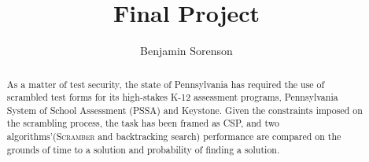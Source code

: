 \documentclass[11pt]{article}
\begin{document}
\author{Benjamin Sorenson} \title{Final Project}
\maketitle

\begin{abstract}

  As a matter of test security, the state of Pennsylvania has required
  the use of scrambled test forms for its high-stakes K-12 assessment
  programs, Pennsylvania System of School Assessment (PSSA) and
  Keystone. Given the constraints imposed on the scrambling process,
  the task has been framed as CSP, and two
  algorithms'(\textsc{Scramber} and backtracking search) performance
  are compared on the grounds of time to a solution and probability of
  finding a solution.
\end{abstract}
\end{document}

